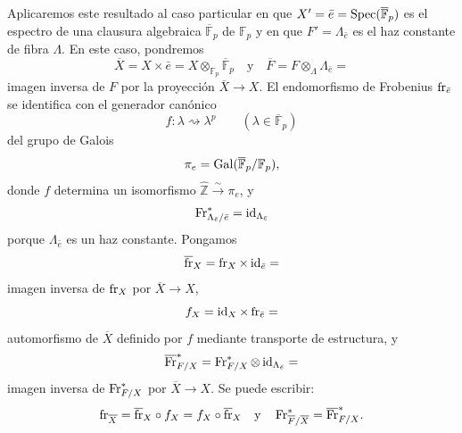 Aplicaremos este resultado al caso particular en que $X'=\bar e=\operatorname{Spec}(\overline{\mathbb F}_p)$ es el espectro de una clausura algebraica $\overline{\mathbb F}_p$ de $\mathbb F_p$ y en que $F'=\Lambda_{\bar e}$ es el haz constante de fibra $\Lambda$. En este caso, pondremos
\[
\overline X=X\times\bar e=X\otimes_{\mathbb F_p}\overline{\mathbb F}_p\quad\text{y}\quad
\overline F=F\otimes_\Lambda\Lambda_{\bar e}=
\]
imagen inversa de $F$ por la proyección $\overline X\to X$. El endomorfismo de Frobenius $\operatorname{fr}_{\bar e}$ se identifica con el generador canónico
\[
f:\lambda\rightsquigarrow\lambda^p\qquad(\lambda\in\overline{\mathbb F}_p)
\]
del grupo de Galois
\[
\pi_e=\operatorname{Gal}(\overline{\mathbb F}_p/\mathbb F_p),
\]
donde $f$ determina un isomorfismo $\widehat{\mathbb Z}\xrightarrow{\sim}\pi_e$, y
\[
\operatorname{Fr}^*_{\Lambda_{\bar e}/\bar e}=\operatorname{id}_{\Lambda_{\bar e}}
\]
porque $\Lambda_{\bar e}$ es un haz constante. Pongamos
\[
\overline{\operatorname{fr}}_X=\operatorname{fr}_X\times\operatorname{id}_{\bar e}=
\]
imagen inversa de $\operatorname{fr}_X$ por $\overline X\to X$,
\[
f_X=\operatorname{id}_X\times\operatorname{fr}_{\bar e}=
\]
automorfismo de $\overline X$ definido por $f$ mediante transporte de estructura, y
\[
\overline{\operatorname{Fr}}^*_{F/X}=\operatorname{Fr}^*_{F/X}\otimes\operatorname{id}_{\Lambda_{\bar e}}=
\]
imagen inversa de $\operatorname{Fr}^*_{F/X}$ por $\overline X\to X$. Se puede escribir:
\[
\operatorname{fr}_{\overline X}=\overline{\operatorname{fr}}_X\circ f_X=f_X\circ\overline{\operatorname{fr}}_X\quad\text{y}\quad
\operatorname{Fr}^*_{\overline F/\overline X}=\overline{\operatorname{Fr}}^*_{F/X}.
\]
